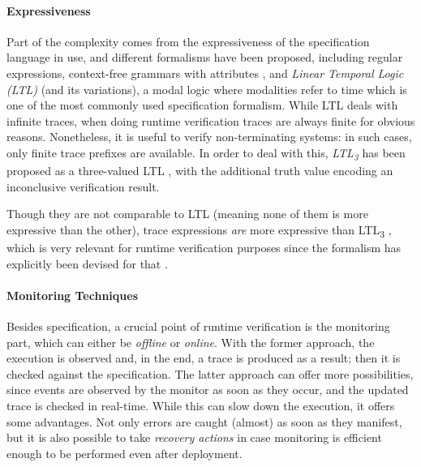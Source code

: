 
\paragraph{Expressiveness}
Part of the complexity comes from the expressiveness of the specification language in use, and different formalisms have been proposed,
including regular expressions, context-free grammars with attributes \cite{de2014combining,BoerEtAl14},
and \emph{Linear Temporal Logic (LTL)} \cite{ltl} (and its variations), a modal logic where modalities refer to time which is
one of the most commonly used specification formalism. 
While LTL deals with infinite traces, when doing runtime verification traces are always finite for obvious reasons.
Nonetheless, it is useful to verify non-terminating systems: in such cases, only finite trace prefixes are available.
In order to deal with this, \emph{LTL\textsubscript{3}} has been proposed as a three-valued LTL \cite{ltl3}, with the additional truth value encoding an inconclusive verification result.

Though they are not comparable to LTL (meaning none of them is more expressive than the other), trace expressions \emph{are} more expressive than LTL\textsubscript{3} \cite{ancona2016comparing}, which is very relevant for runtime verification purposes since the formalism has explicitly been devised for that \cite{ltl3}.

\paragraph{Monitoring Techniques}
Besides specification, a crucial point of runtime verification is the monitoring part, which can either be \emph{offline} or \emph{online}.
With the former approach, the execution is observed and, in the end, a trace is produced as a result; then it is checked against the specification.
The latter approach can offer more possibilities, since events are observed by the monitor as soon as they occur, and the updated trace is checked in real-time.
While this can slow down the execution, it offers some advantages.
Not only errors are caught (almost) as soon as they manifest, but it is also possible to take \emph{recovery actions} \cite{ancona2015global} in case
monitoring is efficient enough to be performed even after deployment.

